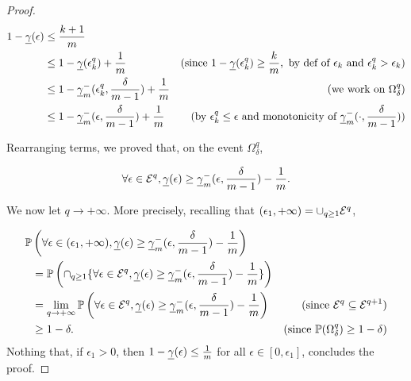 \begin{proof}
    \begin{equation}
        \begin{aligned}
            1 - \underline{\gamma}(\epsilon) &\leq \frac{k+1}{m} \\
            &\leq 1 - \underline{\gamma}(\epsilon_k^q)+\frac{1}{m} &\text{(since } 1 - \underline{\gamma}(\epsilon_k^q) \geq \frac{k}{m}, \text{ by def of $\epsilon_k$ and $\epsilon_k^q > \epsilon_k)$} \\
            &\leq 1 - \underline{\gamma}_{m}^{-}(\epsilon_k^q,\frac{\delta}{m-1}) + \frac{1}{m} & \text{(we work on $\Omega_{\delta}^{q}$)} \\
            &\leq 1 - \underline{\gamma}_{m}^{-}(\epsilon,\frac{\delta}{m-1}) + \frac{1}{m} & \text{(by $\epsilon_k^q \leq \epsilon$ and monotonicity of $\underline{\gamma}_{m}^{-}(\cdot,\frac{\delta}{m-1})$)}\\
        \end{aligned}
    \end{equation}

    Rearranging terms, we proved that, on the event $\Omega_{\delta}^q$,

    \begin{equation}
        \forall \epsilon \in \mathcal{E}^q, \underline{\gamma}(\epsilon) \geq \underline{\gamma}_{m}^{-}(\epsilon,\frac{\delta}{m-1}) - \frac{1}{m}.
    \end{equation}


    We now let $q\rightarrow+\infty$. More precisely, recalling that $(\epsilon_1, +\infty)=\cup_{q\geq 1} \mathcal{E}^q$,

    \begin{equation*}
        \begin{aligned}
            \mathbb{P}&\left(\forall \epsilon \in (\epsilon_1, +\infty), \underline{\gamma}(\epsilon) \geq \underline{\gamma}_{m}^{-}(\epsilon, \frac{\delta}{m-1})-\frac{1}{m}\right)\\
            &=\mathbb{P}\left(\cap_{q \geq 1} \{\forall \epsilon \in \mathcal{E}^q, \underline{\gamma}(\epsilon) \geq \underline{\gamma}_{m}^{-}(\epsilon, \frac{\delta}{m-1})-\frac{1}{m}\}\right)\\
            &=\lim\limits_{q\rightarrow +\infty} \mathbb{P}\left(\forall \epsilon \in \mathcal{E}^q, \underline{\gamma}(\epsilon) \geq \underline{\gamma}_{m}^{-}(\epsilon,\frac{\delta}{m-1})-\frac{1}{m}\right) & \text{(since $\mathcal{E}^q \subseteq \mathcal{E}^{q+1}$)}\\
            &\geq 1-\delta. & \text{(since $\mathbb{P}(\Omega_\delta^q)\geq 1-\delta$)}
        \end{aligned}
    \end{equation*}
    Nothing that, if $\epsilon_1 > 0$, then $1-\underline{\gamma}(\epsilon) \leq \frac{1}{m}$ for all $\epsilon \in [0,\epsilon_1]$, concludes the proof.   
\end{proof}


